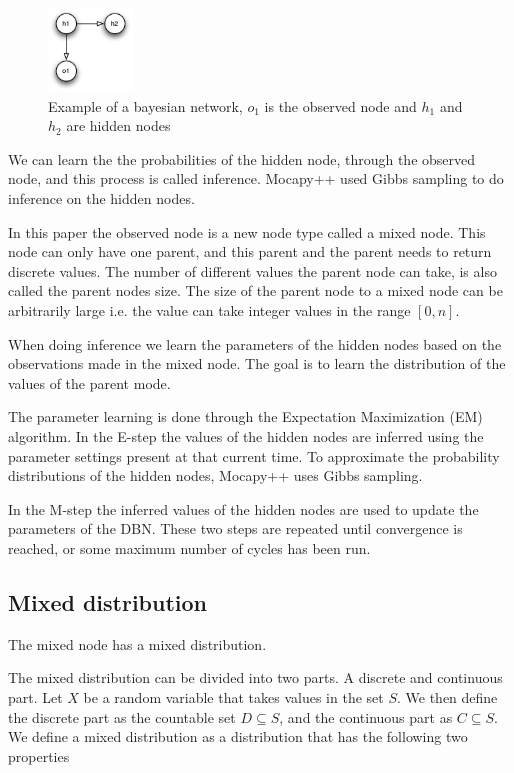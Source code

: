 \documentclass[10pt, journal, compsoc, a4paper]{IEEEtran}
\begin{document}
\begin{figure}[ht]
\centering
\includegraphics[width=0.2\textwidth]{figures/fig2.pdf}
\caption{Example of a bayesian network, $o_1$ is the observed node and $h_1$ and $h_2$ are hidden nodes}
\label{fig2}
\end{figure}

We can learn the the probabilities of the hidden node, through the observed node, and this process is called inference. Mocapy++ used Gibbs sampling to do inference on the hidden nodes. 

In this paper the observed node is a new node type called a mixed node. This node can only have one parent, and this parent and the parent needs to return discrete values. The number of different values the parent node can take, is also called the parent nodes size. The size of the parent node to a mixed node can be arbitrarily large i.e. the value can take integer values in the range $[0,n]$.

When doing inference we learn the parameters of the hidden nodes based on the observations made in the mixed node. The goal is to learn the distribution of the values of the parent mode. 

The parameter learning is done through the Expectation Maximization (EM) algorithm. In the E-step the values of the hidden nodes are inferred using the parameter settings present at that current time. To approximate the probability distributions of the hidden nodes, Mocapy++ uses Gibbs sampling.

In the M-step the inferred values of the hidden nodes are used to update the parameters of the DBN. These two steps are repeated until convergence is reached, or some maximum number of cycles has been run. 


\subsection{Mixed distribution} %
\label{sub:mixed_distribution}
The mixed node has a mixed distribution.

The mixed distribution can be divided into two parts. A discrete and continuous part. Let $X$ be a random variable that takes values in the set $S$. We then define the discrete part as the countable set $D \subseteq S$, and the continuous part as $C \subseteq S$. We define a mixed distribution as a distribution that has the following two properties\cite{mixed}
\end{document}
